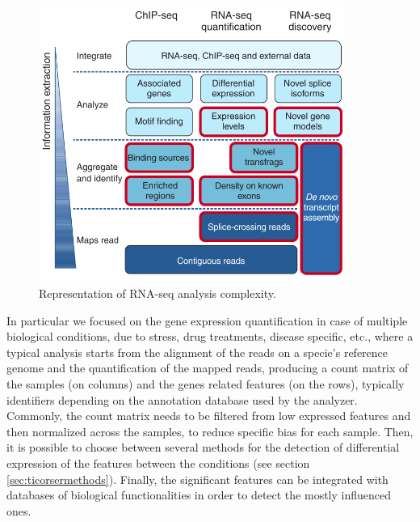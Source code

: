 \begin{figure}[h]
\centering
\includegraphics[width=10cm, keepaspectratio]{img/intro/rna-seqan.png}
\caption[RNA-seq analysis]{Representation of RNA-seq analysis complexity. \cite{Pepke2009}}
\label{fig:rnaseqan}
\end{figure}

In particular we focused on the gene expression quantification in case of multiple biological conditions, due to stress, drug treatments, disease specific, etc., where a typical analysis starts from the alignment of the reads on a specie's reference genome and the quantification of the mapped reads, producing a count matrix of the samples (on columns) and the genes related features (on the rows), typically identifiers depending on the annotation database used by the analyzer.
Commonly, the count matrix needs to be filtered from low expressed features and then normalized across the samples, to reduce specific bias for each sample.
Then, it is possible to choose between several methods for the detection of differential expression of the features between the conditions (see section \ref{sec:ticorsermethods}).
Finally, the significant features can be integrated with databases of biological functionalities in order to detect the mostly influenced ones.


